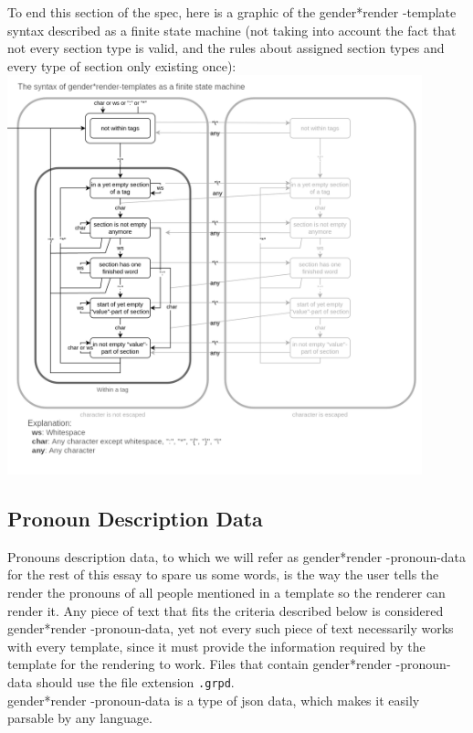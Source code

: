 \documentclass{article}
\newcommand{\GenderRender}{
    gender*render
}
\begin{document}
    To end this section of the spec, here is a graphic of the \GenderRender-template syntax described as a finite state machine (not taking into account the fact that not every section type is valid, and the rules about assigned section types and every type of section only existing once):\\

    \includegraphics[width=12cm]{images/template-as-finite-state-machine.png}

    \subsection{Pronoun Description Data}

     Pronouns description data, to which we will refer as \GenderRender-pronoun-data for the rest of this essay to spare us some words, is the way the user tells the render the pronouns of all people mentioned in a template so the renderer can render it.
     Any piece of text that fits the criteria described below is considered \GenderRender-pronoun-data, yet not every such piece of text necessarily works with every template, since it must provide the information required by the template for the rendering to work.
    Files that contain \GenderRender-pronoun-data should use the file extension \texttt{.grpd}.\\

    \GenderRender-pronoun-data is a type of json data, which makes it easily parsable by any language.\\
\end{document}
